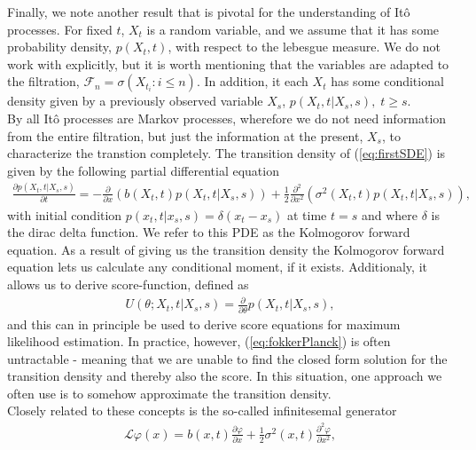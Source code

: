 Finally, we note another result that is pivotal for the understanding of Itô processes. For fixed $t$, $X_t$ is a random variable, and we assume that it has some probability density, $p(X_t, t)$, with respect to the lebesgue measure. We do not work with explicitly, but it is worth mentioning that the variables are adapted to the filtration, $\mathcal{F}_n = \sigma\left(X_{t_i}: i \leq n\right)$. In addition, it each $X_t$ has some conditional density given by a previously observed variable $X_s$, $p(X_t, t | X_s, s), \; t\geq s$.\\ 
By \cite[theorem 7.1.2]{Oksendal2003_yu} all Itô processes are Markov processes, wherefore we do not need information from the entire filtration, but just the information at the present, $X_s$, to characterize the transtion completely. The transition density of (\ref{eq:firstSDE}) is given by the following partial differential equation
\begin{align}
    \frac{\partial p(X_t, t | X_s, s)}{\partial t} = -\frac{\partial}{\partial x}\left(b(X_t, t)p(X_t, t | X_s, s)\right) + \frac{1}{2}\frac{\partial^2}{\partial x^2}\left(\sigma^2(X_t, t)p(X_t, t | X_s, s)\right),\label{eq:fokkerPlanck} 
\end{align}
with initial condition $p(x_t, t|x_s, s) = \delta(x_t - x_s)$ at time $t = s$ and where $\delta$ is the dirac delta function. We refer to this PDE as the Kolmogorov forward equation. As a result of giving us the transition density the Kolmogorov forward equation lets us calculate any conditional moment, if it exists. Additionaly, it allows us to derive score-function, defined as
\begin{align}
    U(\theta; X_t, t | X_s, s) = \frac{\partial}{\partial\theta}p(X_t, t | X_s, s), \label{eq:transitionScore}
\end{align}
and this can in principle be used to derive score equations for maximum likelihood estimation. In practice, however, (\ref{eq:fokkerPlanck}) is often untractable - meaning that we are unable to find the closed form solution for the transition density and thereby also the score. In this situation, one approach we often use is to somehow approximate the transition density.\\
Closely related to these concepts is the so-called infinitesemal generator 
\begin{align}
    \mathcal{L}\varphi(x) = b(x, t) \frac{\partial\varphi}{\partial x} + \frac{1}{2}\sigma^2(x, t)\frac{\partial^2\varphi}{\partial x^2} \label{eq:infinitesemalGeneratorDefinition},
\end{align}
